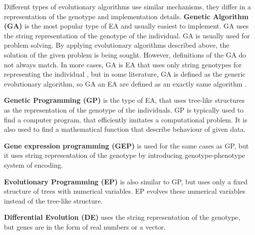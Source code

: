 Different types of evolutionary algorithms use similar mechanisms, they differ in a representation of the genotype and implementation details.
\textbf{Genetic Algorithm (GA)} is the most popular type of EA and usually easiest to implement. GA uses the string representation of the genotype of the individual. GA is usually used for problem solving. By applying evolutionary algorithms described above, the solution of the given problem is being sought. However, definitions of the GA do not always match. In more cases, GA is EA that uses only string genotypes for representing the individual , but in some literature, GA is defined as the generic evolutionary algorithm, so GA an EA are defined as an exactly same algorithm .

\textbf{Genetic Programming (GP)} is the type of EA, that uses tree-like structures as the representation of the genotype of the individuals. GP is typically used to find a computer program, that efficiently imitates a computational problem. It is also used to find a mathematical function that describe behaviour of given data.

\textbf{Gene expression programming (GEP)} is used for the same cases as GP, but it uses string representation of the genotype by introducing genotype-phenotype system of encoding.

\textbf{Evolutionary Programming (EP)} is also similar to GP, but uses only a fixed structure of trees with numerical variables. EP evolves these numerical variables instead of the tree-like structure.

\textbf{Differential Evolution (DE)} uses the string representation of the genotype, but genes are in the form of real numbers or a vector.
